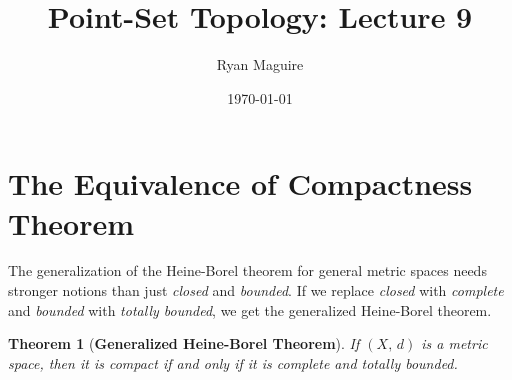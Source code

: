 \documentclass{article}
\title{Point-Set Topology: Lecture 9}
\author{Ryan Maguire}
\date{\today}
\theoremstyle{plain}
\newtheorem{theorem}{Theorem}[section]
\theoremstyle{normal}
\begin{document}
    \maketitle
    \section{The Equivalence of Compactness Theorem}
        The generalization of the Heine-Borel theorem for general metric spaces
        needs stronger notions than just \textit{closed} and \textit{bounded}.
        If we replace \textit{closed} with \textit{complete} and
        \textit{bounded} with \textit{totally bounded}, we get the
        generalized Heine-Borel theorem.
        \begin{theorem}[\textbf{Generalized Heine-Borel Theorem}]
            If $(X,\,d)$ is a metric space, then it is compact if and only
            if it is complete and totally bounded.
        \end{theorem}
\end{document}
